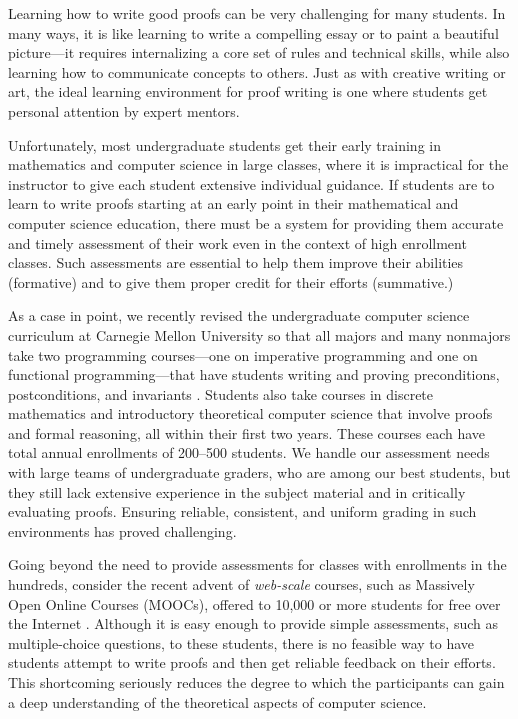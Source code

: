 \documentclass[12pt]{article}
\begin{document}
Learning how to write good proofs can be very challenging for many
students.  In many ways, it is like learning to write a compelling
essay or to paint a beautiful picture---it requires internalizing a
core set of rules and technical skills, while also learning how to
communicate concepts to others.  Just as with creative writing or art,
the ideal learning environment for proof writing is one where
students get personal attention by expert mentors.

Unfortunately, most undergraduate students get their early training in
mathematics and computer science in large classes, where it is
impractical for the instructor to give each student extensive
individual guidance.  If students are to learn to write proofs
starting at an early point in their mathematical and computer science
education, there must be a system for providing them accurate and
timely assessment of their work even in the context of high enrollment
classes.  Such assessments are essential to help them improve their
abilities (formative) and to give them proper credit for their efforts
(summative.)

As a case in point, we recently revised the undergraduate computer science
curriculum at Carnegie Mellon University so that all majors and many
nonmajors take two programming courses---one on imperative programming
and one on functional programming---that have students writing and
proving preconditions, postconditions, and invariants
\cite{bryant-ugrad10}.  Students also take courses in
discrete mathematics and introductory theoretical computer science
that involve proofs and formal reasoning, all within their first two years.
These courses each have
total annual enrollments of 200--500 students.  We handle our
assessment needs with large teams of undergraduate graders, who are
among our best students, but they still lack extensive experience in
the subject material and in critically evaluating proofs.  Ensuring
reliable, consistent, and uniform grading in such environments has proved
challenging.

Going beyond the need to provide assessments for classes with
enrollments in the hundreds, consider the recent advent of {\em web-scale}
courses, such as Massively Open Online Courses (MOOCs),
 offered to 10,000 or more students for free over the Internet
\cite{carson-am12,lewin-nyt12}.
Although it is easy enough to provide simple
assessments, such as multiple-choice questions, to these students,
there is no feasible way to have students attempt to write proofs and
then get reliable feedback on their efforts.  This shortcoming
seriously reduces the degree to which the participants can gain a deep
understanding of the theoretical aspects of computer science.
\end{document}
